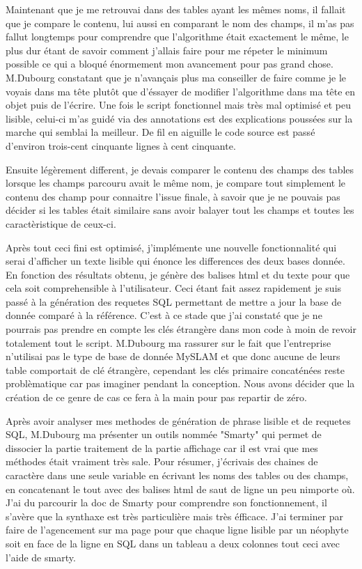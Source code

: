 Maintenant que je me retrouvai dans des tables ayant les mêmes noms, il fallait
que je compare le contenu, lui aussi en comparant le nom des champs, il m'as
pas fallut longtemps pour comprendre que l'algorithme était exactement le même,
le plus dur étant de savoir comment j'allais faire pour me répeter le minimum
possible ce qui a bloqué énormement mon avancement pour pas grand chose.
M.Dubourg constatant que je n'avançais plus ma conseiller de faire comme je le
voyais dans ma tête plutôt que d'éssayer de modifier l'algorithme dans ma tête
en objet puis de l'écrire. Une fois le script fonctionnel mais très mal
optimisé et peu lisible, celui-ci m'as guidé via des annotations est des
explications poussées sur la marche qui semblai la meilleur. De fil en aiguille
le code source est passé d'environ trois-cent cinquante lignes à cent
cinquante.

Ensuite légèrement different, je devais comparer le contenu des champs des
tables lorsque les champs parcouru avait le même nom, je compare tout
simplement le contenu des champ pour connaitre l'issue finale, à savoir que je
ne pouvais pas décider si les tables était similaire sans avoir balayer tout
les champs et toutes les caractèristique de ceux-ci.

Après tout ceci fini est optimisé, j'implémente une nouvelle fonctionnalité qui
serai d'afficher un texte lisible qui énonce les differences des deux bases
donnée. En fonction des résultats obtenu, je génère des balises html et du
texte pour que cela soit comprehensible à l'utilisateur. Ceci étant fait assez
rapidement je suis passé à la génération des requetes SQL permettant de mettre
a jour la base de donnée comparé à la référence. C'est à ce stade que j'ai
constaté que je ne pourrais pas prendre en compte les clés étrangère dans mon
code à moin de revoir totalement tout le script.  M.Dubourg ma rassurer sur le
fait que l'entreprise n'utilisai pas le type de base de donnée MySLAM et que
donc aucune de leurs table comportait de clé étrangère, cependant les clés
primaire concaténées reste problèmatique car pas imaginer pendant la
conception. Nous avons décider que la création de ce genre de cas ce fera à la
main pour pas repartir de zéro.

Après avoir analyser mes methodes de génération de phrase lisible et de
requetes SQL, M.Dubourg ma présenter un outils nommée "Smarty" qui permet de
dissocier la partie traitement de la partie affichage car il est vrai que mes
méthodes était vraiment très sale. Pour résumer, j'écrivais des chaines de
caractère dans une seule variable en écrivant les noms des tables ou des
champs, en concatenant le tout avec des balises html de saut de ligne un peu
nimporte où. J'ai du parcourir la doc de Smarty pour comprendre son
fonctionnement, il s'avère que la synthaxe est très particulière mais très
éfficace. J'ai terminer par faire de l'agencement sur ma page pour que chaque
ligne lisible par un néophyte soit en face de la ligne en SQL dans un tableau a
deux colonnes tout ceci avec l'aide de smarty.


